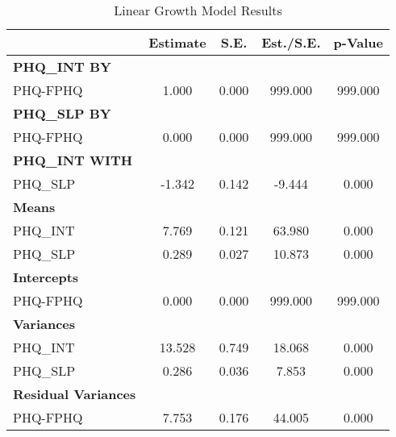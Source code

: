 \documentclass[11pt]{article}
\begin{document}
\begin{table}[ht]
    \centering
    \caption{Linear Growth Model Results} \label{tab:Model Results}
    \begin{tabular}{l c c c c}
        \toprule
        & Estimate & S.E. & Est./S.E. & p-Value \\
        \midrule
        \textbf{PHQ\_INT BY} & & & & \\
        PHQ-FPHQ & 1.000 & 0.000 & 999.000 & 999.000 \\
        \midrule
        \textbf{PHQ\_SLP BY} & & & & \\
        PHQ-FPHQ & 0.000 & 0.000 & 999.000 & 999.000 \\
        \midrule
        \textbf{PHQ\_INT WITH} & & & & \\
        PHQ\_SLP & -1.342 & 0.142 & -9.444 & 0.000 \\
        \midrule
        \textbf{Means} & & & & \\
        PHQ\_INT & 7.769 & 0.121 & 63.980 & 0.000 \\
        PHQ\_SLP & 0.289 & 0.027 & 10.873 & 0.000 \\
        \midrule
        \textbf{Intercepts} & & & & \\
        PHQ-FPHQ & 0.000 & 0.000 & 999.000 & 999.000 \\
        \midrule
        \textbf{Variances} & & & & \\
        PHQ\_INT & 13.528 & 0.749 & 18.068 & 0.000 \\
        PHQ\_SLP & 0.286 & 0.036 & 7.853 & 0.000 \\
        \midrule
        \textbf{Residual Variances} & & & & \\
        PHQ-FPHQ & 7.753 & 0.176 & 44.005 & 0.000 \\
        \bottomrule
    \end{tabular}
\end{table}
\end{document}
